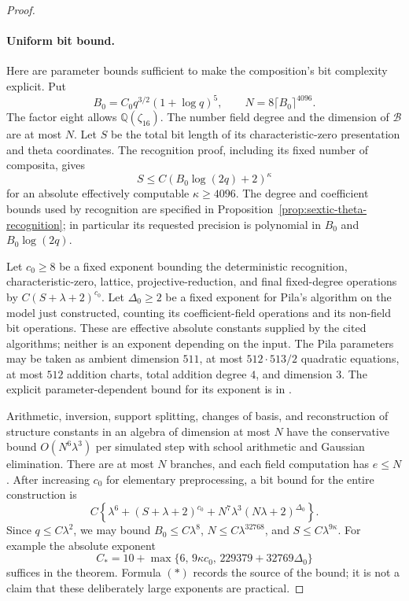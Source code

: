 \documentclass[11pt]{article}
\theoremstyle{definition}
\theoremstyle{remark}
\begin{document}
\begin{proof}
\paragraph{Uniform bit bound.}
Here are parameter bounds sufficient to make the composition's
bit complexity explicit. Put
\[
 B_0=C_0q^{3/2}(1+\log q)^5,
 \qquad N=8\lceil B_0\rceil^{4096}.
\]
The factor eight allows \(\mathbb Q(\zeta_{16})\). The number
field degree and the dimension of \(\mathcal B\) are at most
\(N\). Let \(S\) be the total bit length of its
characteristic-zero presentation and theta coordinates. The
recognition proof, including its fixed number of composita,
gives
\[
 S\le C(B_0\log(2q)+2)^\kappa
\]
for an absolute effectively computable \(\kappa\ge4096\).
The degree and coefficient bounds used by recognition are
specified in Proposition~\ref{prop:sextic-theta-recognition};
in particular its requested precision is polynomial in
\(B_0\) and \(B_0\log(2q)\).

Let \(c_0\ge8\) be a fixed exponent bounding the deterministic
recognition, characteristic-zero, lattice, projective-reduction, and final
fixed-degree operations by \(C(S+\lambda+2)^{c_0}\).
Let \(\Delta_0\ge2\) be a fixed exponent for Pila's algorithm
on the model just constructed, counting its coefficient-field
operations and its non-field bit operations. These are effective
absolute constants supplied by the cited algorithms; neither
is an exponent depending on the input. The Pila parameters may
be taken as ambient dimension \(511\), at most
\(512\cdot513/2\) quadratic equations, at most \(512\)
addition charts, total addition degree \(4\), and dimension
\(3\). The explicit parameter-dependent bound for its exponent
is in \citet[Section~4, author pp.~12--14]{Pila1990}.

Arithmetic, inversion, support splitting, changes of basis, and
reconstruction of structure constants in an algebra of dimension at
most \(N\) have the conservative bound \(O(N^6\lambda^3)\)
per simulated step with school arithmetic and Gaussian elimination. There are at most
\(N\) branches, and each field computation has
\(e\le N\). After increasing \(c_0\) for elementary
preprocessing, a bit bound for the entire construction is
\[
 C\left\{\lambda^6+(S+\lambda+2)^{c_0}
             +N^7\lambda^3(N\lambda+2)^{\Delta_0}\right\}.
 \tag{\(\ast\)}\label{eq:composed-cubic-bit-bound}
\]
Since \(q\le C\lambda^2\), we may bound
\(B_0\le C\lambda^8\),
\(N\le C\lambda^{32768}\), and
\(S\le C\lambda^{9\kappa}\).
For example the absolute exponent
\[
 C_* = 10+\max\{6,\,9\kappa c_0,\,
                     229379+32769\Delta_0\}
\]
suffices in the theorem. Formula \((\ast)\) records the
source of the bound; it is not a claim that these deliberately
large exponents are practical.


\end{proof}
\end{document}
